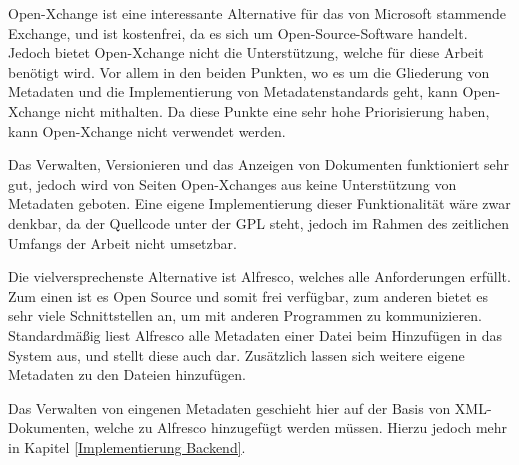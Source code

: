 Open-Xchange ist eine interessante Alternative f\"ur das von Microsoft stammende Exchange, und ist kostenfrei, da es sich um Open-Source-Software handelt. Jedoch bietet Open-Xchange nicht die Unterst\"utzung, welche f\"ur diese Arbeit ben\"otigt wird. Vor allem in den beiden Punkten, wo es um die Gliederung von Metadaten und die Implementierung von Metadatenstandards geht, kann Open-Xchange nicht mithalten. Da diese Punkte eine sehr hohe Priorisierung haben, kann Open-Xchange nicht verwendet werden.

Das Verwalten, Versionieren und das Anzeigen von Dokumenten funktioniert sehr gut, jedoch wird von Seiten Open-Xchanges aus keine Unterst\"utzung von Metadaten geboten. Eine eigene Implementierung dieser Funktionalit\"at w\"are zwar denkbar, da der Quellcode unter der \ac{GPL} steht, jedoch im Rahmen des zeitlichen Umfangs der Arbeit nicht umsetzbar.

Die vielversprechenste Alternative ist Alfresco, welches alle Anforderungen erf\"ullt. Zum einen ist es Open Source und somit frei verf\"ugbar, zum anderen bietet es sehr viele Schnittstellen an, um mit anderen Programmen zu kommunizieren. Standardm\"a\ss{}ig liest Alfresco alle Metadaten einer Datei beim Hinzuf\"ugen in das System aus, und stellt diese auch dar. Zus\"atzlich lassen sich weitere eigene Metadaten zu den Dateien hinzuf\"ugen. 

Das Verwalten von eingenen Metadaten geschieht hier auf der Basis von XML-Dokumenten, welche zu Alfresco hinzugef\"ugt werden m\"ussen.
Hierzu jedoch mehr in Kapitel \ref{Implementierung Backend}.

